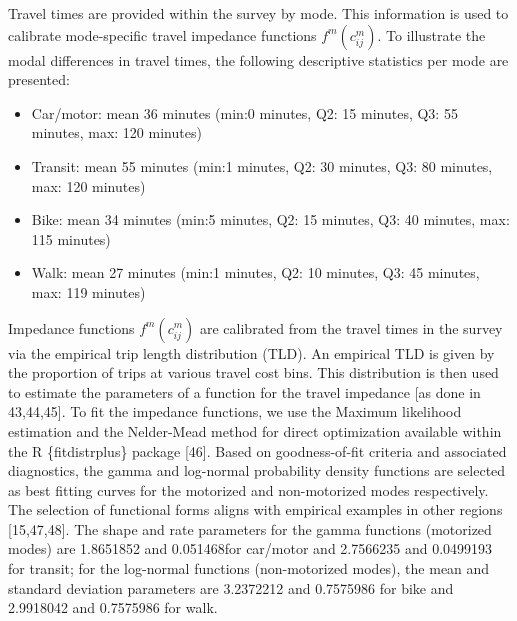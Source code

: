 \documentclass[10pt,letterpaper]{article}
\providecommand{\tightlist}{%
  \setlength{\itemsep}{0pt}\setlength{\parskip}{0pt}}
\begin{document}
Travel times are provided within the survey by mode. This information is
used to calibrate mode-specific travel impedance functions
\(f^m(c_{ij}^m)\). To illustrate the modal differences in travel times,
the following descriptive statistics per mode are presented:

\begin{itemize}
\tightlist
\item
  Car/motor: mean 36 minutes (min:0 minutes, Q2: 15 minutes, Q3: 55
  minutes, max: 120 minutes)
\item
  Transit: mean 55 minutes (min:1 minutes, Q2: 30 minutes, Q3: 80
  minutes, max: 120 minutes)
\item
  Bike: mean 34 minutes (min:5 minutes, Q2: 15 minutes, Q3: 40 minutes,
  max: 115 minutes)
\item
  Walk: mean 27 minutes (min:1 minutes, Q2: 10 minutes, Q3: 45 minutes,
  max: 119 minutes)
\end{itemize}

Impedance functions \(f^m(c_{ij}^m)\) are calibrated from the travel
times in the survey via the empirical trip length distribution (TLD). An
empirical TLD is given by the proportion of trips at various travel cost
bins. This distribution is then used to estimate the parameters of a
function for the travel impedance {[}as done in 43,44,45{]}. To fit the
impedance functions, we use the Maximum likelihood estimation and the
Nelder-Mead method for direct optimization available within the R
\{fitdistrplus\} package {[}46{]}. Based on goodness-of-fit criteria and
associated diagnostics, the gamma and log-normal probability density
functions are selected as best fitting curves for the motorized and
non-motorized modes respectively. The selection of functional forms
aligns with empirical examples in other regions {[}15,47,48{]}. The
shape and rate parameters for the gamma functions (motorized modes) are
1.8651852 and 0.051468for car/motor and 2.7566235 and 0.0499193 for
transit; for the log-normal functions (non-motorized modes), the mean
and standard deviation parameters are 3.2372212 and 0.7575986 for bike
and 2.9918042 and 0.7575986 for walk.
\end{document}
